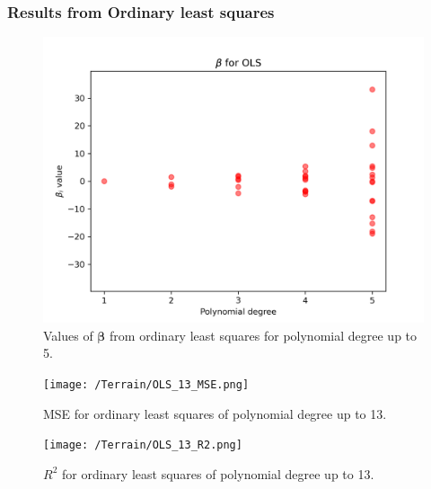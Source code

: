 \documentclass{article}
\begin{document}
\subsubsection{Results from Ordinary least squares}
\begin{figure}[htbp]
    \centering
    \includegraphics[width=\textwidth*2/3]{Terrain/OLS_5_betas.png}
    \caption{Values of $\boldsymbol{\beta}$ from ordinary least squares for polynomial degree up to 5.}
    \label{fig:TerrainOLS5Beta}
\end{figure}

\begin{figure}[htbp]
    \centering
    \texttt{[image: /Terrain/OLS\_13\_MSE.png]}
    \caption{MSE for ordinary least squares of polynomial degree up to 13.}
    \label{fig:TerrainOLS5MSE}
\end{figure}

\begin{figure}[htbp]
    \centering
    \texttt{[image: /Terrain/OLS\_13\_R2.png]}
    \caption{$R^2$ for ordinary least squares of polynomial degree up to 13.}
    \label{fig:TerrainOLS5R2}
\end{figure}
\end{document}
